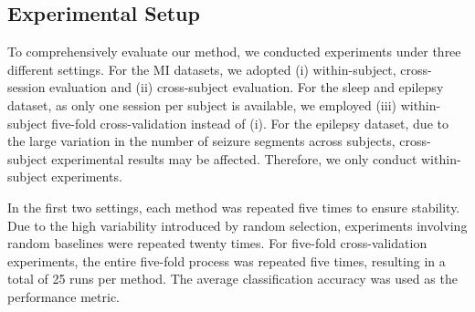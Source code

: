 \documentclass[journal,twocolumn]{IEEEtran}
\begin{document}
\subsection{Experimental Setup}
To comprehensively evaluate our method, we conducted experiments under three different settings. For the MI datasets, we adopted (i) within-subject, cross-session evaluation and (ii) cross-subject evaluation. For the sleep and epilepsy dataset, as only one session per subject is available, we employed (iii) within-subject five-fold cross-validation instead of (i). For the epilepsy dataset, due to the large variation in the number of seizure segments across subjects, cross-subject experimental results may be affected. Therefore, we only conduct within-subject experiments.

In the first two settings, each method was repeated five times to ensure stability. Due to the high variability introduced by random selection, experiments involving random baselines were repeated twenty times. For five-fold cross-validation experiments, the entire five-fold process was repeated five times, resulting in a total of 25 runs per method. The average classification accuracy was used as the performance metric.
\end{document}
